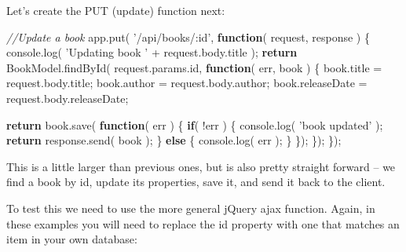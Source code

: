 \documentclass[9pt]{book}
\newenvironment{Shaded}{}{}
\newcommand{\KeywordTok}[1]{\textcolor[rgb]{0.00,0.44,0.13}{\textbf{{#1}}}}
\newcommand{\StringTok}[1]{\textcolor[rgb]{0.25,0.44,0.63}{{#1}}}
\newcommand{\CommentTok}[1]{\textcolor[rgb]{0.38,0.63,0.69}{\textit{{#1}}}}
\newcommand{\OtherTok}[1]{\textcolor[rgb]{0.00,0.44,0.13}{{#1}}}
\newcommand{\FunctionTok}[1]{\textcolor[rgb]{0.02,0.16,0.49}{{#1}}}
\newcommand{\NormalTok}[1]{{#1}}
\begin{document}
Let's create the PUT (update) function next:

\begin{Shaded}
\begin{Highlighting}[]
\CommentTok{//Update a book}
\OtherTok{app}\NormalTok{.}\FunctionTok{put}\NormalTok{( }\StringTok{'/api/books/:id'}\NormalTok{, }\KeywordTok{function}\NormalTok{( request, response ) \{}
    \OtherTok{console}\NormalTok{.}\FunctionTok{log}\NormalTok{( }\StringTok{'Updating book '} \NormalTok{+ }\OtherTok{request}\NormalTok{.}\OtherTok{body}\NormalTok{.}\FunctionTok{title} \NormalTok{);}
    \KeywordTok{return} \OtherTok{BookModel}\NormalTok{.}\FunctionTok{findById}\NormalTok{( }\OtherTok{request}\NormalTok{.}\OtherTok{params}\NormalTok{.}\FunctionTok{id}\NormalTok{, }\KeywordTok{function}\NormalTok{( err, book ) \{}
        \OtherTok{book}\NormalTok{.}\FunctionTok{title} \NormalTok{= }\OtherTok{request}\NormalTok{.}\OtherTok{body}\NormalTok{.}\FunctionTok{title}\NormalTok{;}
        \OtherTok{book}\NormalTok{.}\FunctionTok{author} \NormalTok{= }\OtherTok{request}\NormalTok{.}\OtherTok{body}\NormalTok{.}\FunctionTok{author}\NormalTok{;}
        \OtherTok{book}\NormalTok{.}\FunctionTok{releaseDate} \NormalTok{= }\OtherTok{request}\NormalTok{.}\OtherTok{body}\NormalTok{.}\FunctionTok{releaseDate}\NormalTok{;}

        \KeywordTok{return} \OtherTok{book}\NormalTok{.}\FunctionTok{save}\NormalTok{( }\KeywordTok{function}\NormalTok{( err ) \{}
            \KeywordTok{if}\NormalTok{( !err ) \{}
                \OtherTok{console}\NormalTok{.}\FunctionTok{log}\NormalTok{( }\StringTok{'book updated'} \NormalTok{);}
            \KeywordTok{return} \OtherTok{response}\NormalTok{.}\FunctionTok{send}\NormalTok{( book );}
        \NormalTok{\} }\KeywordTok{else} \NormalTok{\{}
            \OtherTok{console}\NormalTok{.}\FunctionTok{log}\NormalTok{( err );}
        \NormalTok{\}}
        \NormalTok{\});}
    \NormalTok{\});}
\NormalTok{\});}
\end{Highlighting}
\end{Shaded}

This is a little larger than previous ones, but is also pretty straight
forward -- we find a book by id, update its properties, save it, and
send it back to the client.

To test this we need to use the more general jQuery ajax function.
Again, in these examples you will need to replace the id property with
one that matches an item in your own database:
\end{document}
